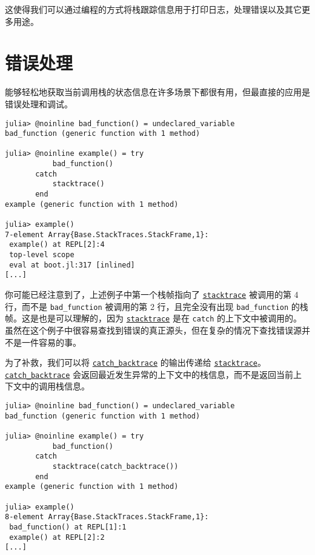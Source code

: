 这使得我们可以通过编程的方式将栈跟踪信息用于打印日志，处理错误以及其它更多用途。



\hypertarget{6556726272179975372}{}


\section{错误处理}



能够轻松地获取当前调用栈的状态信息在许多场景下都很有用，但最直接的应用是错误处理和调试。




\begin{verbatim}
julia> @noinline bad_function() = undeclared_variable
bad_function (generic function with 1 method)

julia> @noinline example() = try
           bad_function()
       catch
           stacktrace()
       end
example (generic function with 1 method)

julia> example()
7-element Array{Base.StackTraces.StackFrame,1}:
 example() at REPL[2]:4
 top-level scope
 eval at boot.jl:317 [inlined]
[...]
\end{verbatim}



你可能已经注意到了，上述例子中第一个栈帧指向了 \hyperlink{11964270650763140298}{\texttt{stacktrace}} 被调用的第 4 行，而不是 \texttt{bad\_function} 被调用的第 2 行，且完全没有出现 \texttt{bad\_function} 的栈帧。这是也是可以理解的，因为 \hyperlink{11964270650763140298}{\texttt{stacktrace}} 是在 \texttt{catch} 的上下文中被调用的。虽然在这个例子中很容易查找到错误的真正源头，但在复杂的情况下查找错误源并不是一件容易的事。



为了补救，我们可以将 \hyperlink{98342946516168163}{\texttt{catch\_backtrace}} 的输出传递给 \hyperlink{11964270650763140298}{\texttt{stacktrace}}。\hyperlink{98342946516168163}{\texttt{catch\_backtrace}} 会返回最近发生异常的上下文中的栈信息，而不是返回当前上下文中的调用栈信息。




\begin{verbatim}
julia> @noinline bad_function() = undeclared_variable
bad_function (generic function with 1 method)

julia> @noinline example() = try
           bad_function()
       catch
           stacktrace(catch_backtrace())
       end
example (generic function with 1 method)

julia> example()
8-element Array{Base.StackTraces.StackFrame,1}:
 bad_function() at REPL[1]:1
 example() at REPL[2]:2
[...]
\end{verbatim}



